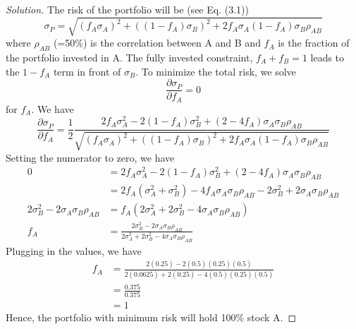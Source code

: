 \begin{proof}[Solution]
 The risk of the portfolio will be (see Eq. (3.1))
 \begin{equation*}
  \sigma_{P} = \sqrt{ (f_{A} \sigma_{A})^2 + ((1-f_{A})\sigma_{B})^{2} + 2f_{A}\sigma_{A}(1-f_{A})\sigma_{B}\rho_{AB}}
 \end{equation*}
 where $\rho_{AB}$ (=50\%) is the correlation between A and B and $f_{A}$ is the fraction of the portfolio invested in A. The fully invested constraint, $f_{A}+f_{B}=1$ leads to the $1-f_{A}$ term in front of $\sigma_{B}$. To minimize the total risk, we solve 
 \begin{equation*}
  \frac{\partial \sigma_{P}}{\partial f_{A}} = 0
 \end{equation*}
 for $f_{A}$. We have
 \begin{equation}
  \frac{\partial \sigma_{P}}{\partial f_{A}} = \frac{1}{2}\frac{2f_{A}\sigma_{A}^{2}-2(1-f_{A})\sigma_{B}^{2}+(2-4f_{A})\sigma_{A}\sigma_{B}\rho_{AB}}{\sqrt{(f_{A} \sigma_{A})^2 + ((1-f_{A})\sigma_{B})^{2} + 2f_{A}\sigma_{A}(1-f_{A})\sigma_{B}\rho_{AB}}}
 \end{equation}
 Setting the numerator to zero, we have
 \begin{align*}
  0 &= 2f_{A}\sigma_{A}^{2}-2(1-f_{A})\sigma_{B}^{2}+(2-4f_{A})\sigma_{A}\sigma_{B}\rho_{AB}\\  
    &= 2f_{A}(\sigma_{A}^{2}+\sigma_{B}^{2})-4f_{A}\sigma_{A}\sigma_{B}\rho_{AB}-2\sigma_{B}^{2}+2\sigma_{A}\sigma_{B}\rho_{AB}\\  
    2\sigma_{B}^{2}-2\sigma_{A}\sigma_{B}\rho_{AB} &= f_{A}(2\sigma_{A}^{2}+2\sigma_{B}^{2}-4\sigma_{A}\sigma_{B}\rho_{AB})\\
    f_{A}&=\frac{2\sigma_{B}^{2}-2\sigma_{A}\sigma_{B}\rho_{AB}}{2\sigma_{A}^{2}+2\sigma_{B}^{2}-4\sigma_{A}\sigma_{B}\rho_{AB}}
 \end{align*}
 Plugging in the values, we have
 \begin{align*}
    f_{A}&=\frac{2(0.25)-2(0.5)(0.25)(0.5)}{2(0.0625)+2(0.25)-4(0.5)(0.25)(0.5)}\\
         &=\frac{0.375}{0.375}\\
         &=1
 \end{align*}
 Hence, the portfolio with minimum risk will hold 100\% stock A.

\end{proof}

